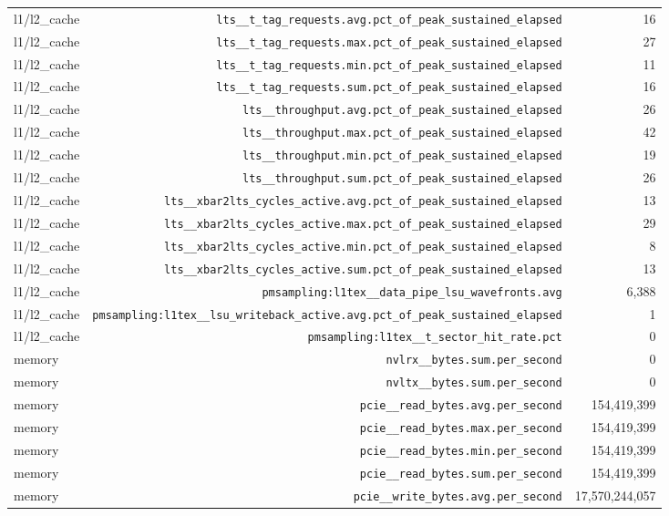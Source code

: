 \begin{table}[h]
\begin{tabular}{|l|r|r|}
l1/l2_cache & \texttt{lts__t_tag_requests.avg.pct_of_peak_sustained_elapsed} & 16 \\
l1/l2_cache & \texttt{lts__t_tag_requests.max.pct_of_peak_sustained_elapsed} & 27 \\
l1/l2_cache & \texttt{lts__t_tag_requests.min.pct_of_peak_sustained_elapsed} & 11 \\
l1/l2_cache & \texttt{lts__t_tag_requests.sum.pct_of_peak_sustained_elapsed} & 16 \\
l1/l2_cache & \texttt{lts__throughput.avg.pct_of_peak_sustained_elapsed} & 26 \\
l1/l2_cache & \texttt{lts__throughput.max.pct_of_peak_sustained_elapsed} & 42 \\
l1/l2_cache & \texttt{lts__throughput.min.pct_of_peak_sustained_elapsed} & 19 \\
l1/l2_cache & \texttt{lts__throughput.sum.pct_of_peak_sustained_elapsed} & 26 \\
l1/l2_cache & \texttt{lts__xbar2lts_cycles_active.avg.pct_of_peak_sustained_elapsed} & 13 \\
l1/l2_cache & \texttt{lts__xbar2lts_cycles_active.max.pct_of_peak_sustained_elapsed} & 29 \\
l1/l2_cache & \texttt{lts__xbar2lts_cycles_active.min.pct_of_peak_sustained_elapsed} & 8 \\
l1/l2_cache & \texttt{lts__xbar2lts_cycles_active.sum.pct_of_peak_sustained_elapsed} & 13 \\
l1/l2_cache & \texttt{pmsampling:l1tex__data_pipe_lsu_wavefronts.avg} & 6,388 \\
l1/l2_cache & \texttt{pmsampling:l1tex__lsu_writeback_active.avg.pct_of_peak_sustained_elapsed} & 1 \\
l1/l2_cache & \texttt{pmsampling:l1tex__t_sector_hit_rate.pct} & 0 \\
\hline
memory & \texttt{nvlrx__bytes.sum.per_second} & 0 \\
memory & \texttt{nvltx__bytes.sum.per_second} & 0 \\
memory & \texttt{pcie__read_bytes.avg.per_second} & 154,419,399 \\
memory & \texttt{pcie__read_bytes.max.per_second} & 154,419,399 \\
memory & \texttt{pcie__read_bytes.min.per_second} & 154,419,399 \\
memory & \texttt{pcie__read_bytes.sum.per_second} & 154,419,399 \\
memory & \texttt{pcie__write_bytes.avg.per_second} & 17,570,244,057 \\

\end{tabular}
\end{table}
